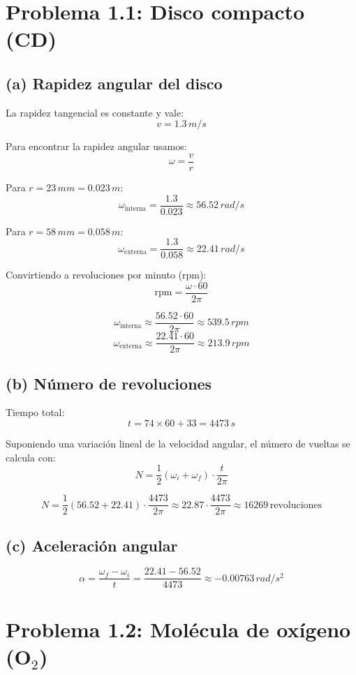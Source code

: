 \documentclass{article}
\begin{document}
\section*{Problema 1.1: Disco compacto (CD)}

\subsection*{(a) Rapidez angular del disco}

La rapidez tangencial es constante y vale:
\[
v = 1.3 \, \si{m/s}
\]

Para encontrar la rapidez angular usamos:
\[
\omega = \frac{v}{r}
\]

Para $r = 23 \, \si{mm} = 0.023 \, \si{m}$:
\[
\omega_\text{interna} = \frac{1.3}{0.023} \approx 56.52 \, \si{rad/s}
\]

Para $r = 58 \, \si{mm} = 0.058 \, \si{m}$:
\[
\omega_\text{externa} = \frac{1.3}{0.058} \approx 22.41 \, \si{rad/s}
\]

Convirtiendo a revoluciones por minuto (rpm):
\[
\text{rpm} = \frac{\omega \cdot 60}{2\pi}
\]

\[
\omega_\text{interna} \approx \frac{56.52 \cdot 60}{2\pi} \approx 539.5 \, \si{rpm}
\]
\[
\omega_\text{externa} \approx \frac{22.41 \cdot 60}{2\pi} \approx 213.9 \, \si{rpm}
\]

\subsection*{(b) Número de revoluciones}

Tiempo total: 
\[
t = 74 \times 60 + 33 = 4473 \, \si{s}
\]

Suponiendo una variación lineal de la velocidad angular, el número de vueltas se calcula con:
\[
N = \frac{1}{2}(\omega_i + \omega_f) \cdot \frac{t}{2\pi}
\]

\[
N = \frac{1}{2}(56.52 + 22.41) \cdot \frac{4473}{2\pi} \approx 22.87 \cdot \frac{4473}{2\pi} \approx 16269 \, \text{revoluciones}
\]

\subsection*{(c) Aceleración angular}

\[
\alpha = \frac{\omega_f - \omega_i}{t} = \frac{22.41 - 56.52}{4473} \approx -0.00763 \, \si{rad/s^2}
\]


\section*{Problema 1.2: Molécula de oxígeno (O$_2$)}
\end{document}
